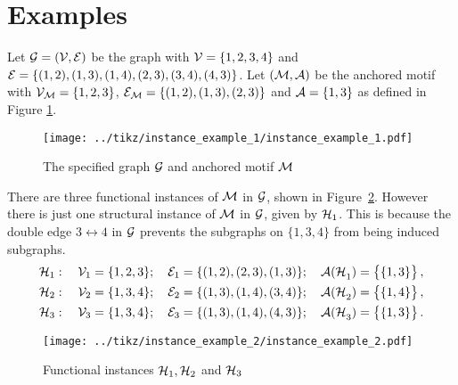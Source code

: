 \section{Examples}






\begin{example} \label{ex:instances}
Let $\mathcal{G}=(\mathcal{V,E})$ be the graph with $\mathcal{V} = \{ 1,2,3,4 \}$ and	$\mathcal{E} = \{ (1,2),(1,3),(1,4),(2,3),(3,4),(4,3) \}$. Let $(\mathcal{M,A})$ be the anchored motif with $\mathcal{V_M} = \{1,2,3\}$, $\mathcal{E_M} = \{(1,2),(1,3),(2,3)\}$ and $\mathcal{A} = \{1,3\}$ as defined in Figure \ref{fig:instance_example_1}.
%
\begin{figure}[H]
\centering
\texttt{[image: ../tikz/instance\_example\_1/instance\_example\_1.pdf]}
\caption{The specified graph $\mathcal{G}$ and anchored motif $\mathcal{M}$}
\label{fig:instance_example_1}
\end{figure}
%
There are three functional instances of $\mathcal{M}$ in $\mathcal{G}$, shown in Figure~\ref{fig:instance_example_2}. However there is just one structural instance of $\mathcal{M}$ in $\mathcal{G}$, given by $\mathcal{H}_1$. This is because the double edge $3 \leftrightarrow 4$ in $\mathcal{G}$ prevents the subgraphs on $\{1,3,4\}$ from being induced subgraphs.
%
\begin{align*}
\mathcal{H}_1 &: \quad \mathcal{V}_1 = \{ 1,2,3 \} ; \quad \mathcal{E}_1 = \{ (1,2) , (2,3) , (1,3) \} ; \quad \mathcal{A(H}_1) =  \big\{\{1,3\}\big\}\,, \\
\mathcal{H}_2 &: \quad \mathcal{V}_2 = \{ 1,3,4 \} ; \quad \mathcal{E}_2 = \{ (1,3) , (1,4) , (3,4) \} ; \quad \mathcal{A(H}_2) =  \big\{\{1,4\}\big\}\,, \\
\mathcal{H}_3 &: \quad \mathcal{V}_3 = \{ 1,3,4 \} ; \quad \mathcal{E}_3 = \{ (1,3) , (1,4) , (4,3) \} ; \quad \mathcal{A(H}_3) =  \big\{\{1,3\}\big\}\,. 
\end{align*}
%
\begin{figure}[H]
\centering
\texttt{[image: ../tikz/instance\_example\_2/instance\_example\_2.pdf]}
\caption{Functional instances $\mathcal{H}_1,\mathcal{H}_2$ and $\mathcal{H}_3$}
\label{fig:instance_example_2}
\end{figure}

\end{example}













